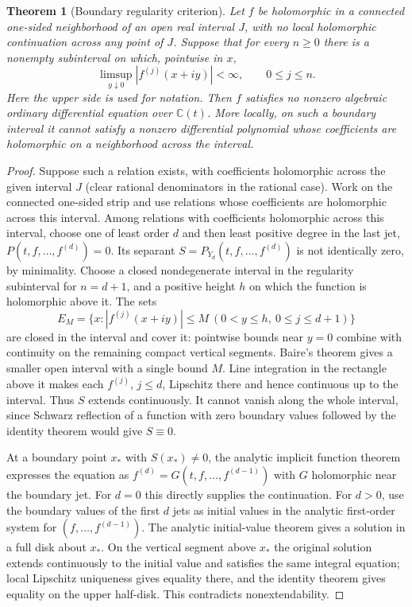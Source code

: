 \documentclass[11pt,a4paper]{article}
\numberwithin{equation}{section}
\theoremstyle{plain}
\newtheorem{theorem}{Theorem}[section]
\theoremstyle{definition}
\begin{document}
\begin{theorem}[Boundary regularity criterion]\label{thm:criterion}
Let $f$ be holomorphic in a connected one-sided neighborhood of an open real interval $J$, with no local holomorphic continuation across any point of $J$. Suppose that for every $n\ge0$ there is a nonempty subinterval on which, pointwise in $x$,
\[
\limsup_{y\downarrow0}|f^{(j)}(x+iy)|<\infty,\qquad 0\le j\le n.
\]
Here the upper side is used for notation. Then $f$ satisfies no nonzero algebraic ordinary differential equation over $\mathbb C(t)$. More locally, on such a boundary interval it cannot satisfy a nonzero differential polynomial whose coefficients are holomorphic on a neighborhood across the interval.
\end{theorem}
\begin{proof}
Suppose such a relation exists, with coefficients holomorphic across the given interval $J$ (clear rational denominators in the rational case). Work on the connected one-sided strip and use relations whose coefficients are holomorphic across this interval. Among relations with coefficients holomorphic across this interval, choose one of least order $d$ and then least positive degree in the last jet, $P(t,f,\ldots,f^{(d)})=0$. Its separant $S=P_{Y_d}(t,f,\ldots,f^{(d)})$ is not identically zero, by minimality. Choose a closed nondegenerate interval in the regularity subinterval for $n=d+1$, and a positive height $h$ on which the function is holomorphic above it. The sets
\[
E_M=\{x: |f^{(j)}(x+iy)|\le M\ (0<y\le h,\ 0\le j\le d+1)\}
\]
are closed in the interval and cover it: pointwise bounds near $y=0$ combine with continuity on the remaining compact vertical segments. Baire's theorem gives a smaller open interval with a single bound $M$. Line integration in the rectangle above it makes each $f^{(j)}$, $j\le d$, Lipschitz there and hence continuous up to the interval. Thus $S$ extends continuously. It cannot vanish along the whole interval, since Schwarz reflection of a function with zero boundary values followed by the identity theorem would give $S\equiv0$.

At a boundary point $x_*$ with $S(x_*)\ne0$, the analytic implicit function theorem expresses the equation as $f^{(d)}=G(t,f,\ldots,f^{(d-1)})$ with $G$ holomorphic near the boundary jet. For $d=0$ this directly supplies the continuation. For $d>0$, use the boundary values of the first $d$ jets as initial values in the analytic first-order system for $(f,\ldots,f^{(d-1)})$. The analytic initial-value theorem gives a solution in a full disk about $x_*$. On the vertical segment above $x_*$ the original solution extends continuously to the initial value and satisfies the same integral equation; local Lipschitz uniqueness gives equality there, and the identity theorem gives equality on the upper half-disk. This contradicts nonextendability.
\end{proof}
\end{document}
